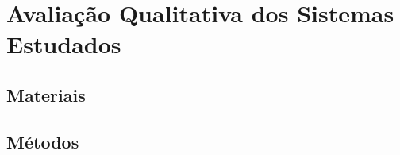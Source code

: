 \chapter{Avaliação Qualitativa dos Sistemas Estudados}
\label{cap:projeto}
\section{Materiais}

\section{Métodos}
